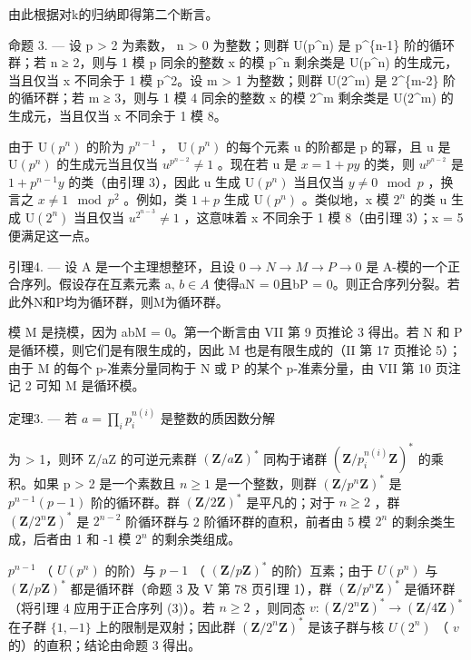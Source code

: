 由此根据对k的归纳即得第二个断言。

命题 3. --- 设 p \textgreater{} 2 为素数， n \textgreater{} 0 为整数；则群 U(p\^{}n) 是 p\^{}\{n-1\} 阶的循环群；若 n ≥ 2，则与 1 模 p 同余的整数 x 的模 p\^{}n 剩余类是 U(p\^{}n) 的生成元，当且仅当 x 不同余于 1 模 p\^{}2。设 m \textgreater{} 1 为整数；则群 U(2\^{}m) 是 2\^{}\{m-2\} 阶的循环群；若 m ≥ 3，则与 1 模 4 同余的整数 x 的模 2\^{}m 剩余类是 U(2\^{}m) 的生成元，当且仅当 x 不同余于 1 模 8。

由于 \(\mathrm{U}(p^{n})\) 的阶为 \(p^{n-1}\) ， \(\mathrm{U}(p^{n})\) 的每个元素 u 的阶都是 p 的幂，且 u 是 \(\mathrm{U}(p^{n})\) 的生成元当且仅当 \(u^{p^{n-2}} \neq 1\) 。现在若 u 是 \(x = 1 + py\) 的类，则 \(u^{p^{n-2}}\) 是 \(1 + p^{n-1}y\) 的类（由引理 3），因此 u 生成 \(\mathrm{U}(p^{n})\) 当且仅当 \(y \neq 0 \mod p\) ，换言之 \(x \neq 1 \mod p^{2}\) 。例如，类 \(1 + p\) 生成 \(\mathrm{U}(p^{n})\) 。类似地，x 模 \(2^{n}\) 的类 u 生成 \(\mathrm{U}(2^{n})\) 当且仅当 \(u^{2^{n-3}} \neq 1\) ，这意味着 x 不同余于 1 模 8（由引理 3）；x = 5 便满足这一点。

引理4. --- 设 A 是一个主理想整环，且设 \(0 \rightarrow N \rightarrow M \rightarrow P \rightarrow 0\) 是 A-模的一个正合序列。假设存在互素元素 a, \(b \in A\) 使得aN = 0且bP = 0。则正合序列分裂。若此外N和P均为循环群，则M为循环群。

模 M 是挠模，因为 abM = 0。第一个断言由 VII 第 9 页推论 3 得出。若 N 和 P 是循环模，则它们是有限生成的，因此 M 也是有限生成的（II 第 17 页推论 5）；由于 M 的每个 p-准素分量同构于 N 或 P 的某个 p-准素分量，由 VII 第 10 页注记 2 可知 M 是循环模。

定理3. --- 若 \(a = \prod_{i} p_{i}^{n(i)}\) 是整数的质因数分解

为 \textgreater{} 1，则环 Z/aZ 的可逆元素群 \((\mathbf{Z}/a\mathbf{Z})^{*}\) 同构于诸群 \((\mathbf{Z}/p_{i}^{n(i)}\mathbf{Z})^{*}\) 的乘积。如果 p \textgreater{} 2 是一个素数且 \(n \geqslant 1\) 是一个整数，则群 \((\mathbf{Z}/p^{n}\mathbf{Z})^{*}\) 是 \(p^{n-1}(p - 1)\) 阶的循环群。群 \((\mathbf{Z}/2\mathbf{Z})^{*}\) 是平凡的；对于 \(n \geqslant 2\) ，群 \((\mathbf{Z}/2^{n}\mathbf{Z})^{*}\) 是 \(2^{n-2}\) 阶循环群与 2 阶循环群的直积，前者由 5 模 \(2^{n}\) 的剩余类生成，后者由 1 和 -1 模 \(2^{n}\) 的剩余类组成。

\(p^{n-1}\) （ \(U(p^n)\) 的阶）与 \(p-1\) （ \((\mathbf{Z}/p\mathbf{Z})^*\) 的阶）互素；由于 \(U(p^n)\) 与 \((\mathbf{Z}/p\mathbf{Z})^*\) 都是循环群（命题 3 及 V 第 78 页引理 1），群 \((\mathbf{Z}/p^n\mathbf{Z})^*\) 是循环群（将引理 4 应用于正合序列 (3)）。若 \(n \geqslant 2\) ，则同态 \(v: (\mathbf{Z}/2^n\mathbf{Z})^* \to (\mathbf{Z}/4\mathbf{Z})^*\) 在子群 \(\{1, -1\}\) 上的限制是双射；因此群 \((\mathbf{Z}/2^n\mathbf{Z})^*\) 是该子群与核 \(U(2^n)\) （ \(v\) 的）的直积；结论由命题 3 得出。

